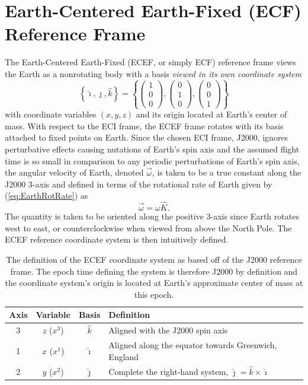 \documentclass[11pt,dvipsnames]{thesis}
\begin{document}
\section{Earth-Centered Earth-Fixed (ECF) Reference Frame}
The Earth-Centered Earth-Fixed (ECEF, or simply ECF) reference frame views the Earth as a nonrotating body with a basis \textit{viewed in its own coordinate system}
\begin{equation}
\left\{\hat{\imath}, \hat{\jmath}, \hat{k}\right\} = \left\{\begin{pmatrix}1 \\ 0 \\ 0\end{pmatrix}, \begin{pmatrix}0 \\ 1 \\ 0\end{pmatrix}, \begin{pmatrix}0 \\ 0 \\ 1\end{pmatrix}\right\} \label{eq:ECEFbasis}
\end{equation}
with coordinate variables $(x, y, z)$ and its origin located at Earth's center of mass.
With respect to the ECI frame, the ECEF frame rotates with its basis attached to fixed points on Earth. Since the chosen ECI frame, J2000, ignores perturbative effects causing nutations of Earth's spin axis and the assumed flight time is so small in comparison to any periodic perturbations of Earth's spin axis, the angular velocity of Earth, denoted $\vec{\omega}$, is taken to be a true constant along the J2000 3-axis and defined in terms of the rotational rate of Earth given by (\ref{eq:EarthRotRate}) as
\begin{equation}
\vec{\omega} = \omega \hat{K}. %
\end{equation}
The quantity is taken to be oriented along the positive 3-axis since Earth rotates west to east, or counterclockwise when viewed from above the North Pole. The ECEF reference coordinate system is then intuitively defined.
\begin{table}[H]
\centering
\caption{The definition of the ECEF coordinate system as based off of the J2000 reference frame. The epoch time defining the system is therefore J2000 by definition and the coordinate system's origin is located at Earth's approximate center of mass at this epoch.}
\label{tab:ECEF}
\begin{tabular}{SSSl}
\toprule
{Axis} & {Variable} & {Basis} & {Definition} \\ \midrule
{3} & {$z$ ($x^3$)} & {$\hat{k}$} & {Aligned with the J2000 spin axis} \\
{1} & {$x$ ($x^1$)} & {$\hat{\imath}$} & {Aligned along the equator towards Greenwich, England} \\%
{2} & {$y$ ($x^2$)} & {$\hat{\jmath}$} & {Complete the right-hand system, $\hat{\jmath} = \hat{k} \times \hat{\imath}$} \\ \bottomrule
\end{tabular}
\end{table}
\end{document}
